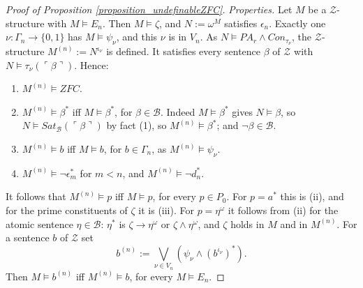 \documentclass{amsart}  %
\numberwithin{equation}{section}
\theoremstyle{definition}
\theoremstyle{remark}
\begin{document}
\begin{proof} [Proof of Proposition \ref{proposition_undefinableZFC}]
\emph{Properties.} Let $M$ be a $\mathcal{Z}$-structure with $M \models E _{n}$. Then $M \models \zeta$, and $N := \omega ^{M}$ satisfies $\epsilon _{n}$. Exactly one $\nu: \Gamma _{n} \to \{0,1\}$ has $M \models \psi _{\nu}$, and this $\nu$ is in $V _{n}$. As $N \models PA _{r} \land Con _{\tau _{\nu}}$, the $\mathcal{Z}$-structure $M ^{(n)} := N ^{\iota _{\nu}}$ is defined. It satisfies every sentence $\beta$ of $\mathcal{Z}$ with $N \models \tau _{\nu} (\ulcorner \beta \urcorner)$. Hence:
\begin{enumerate}
\item[(i)] $M ^{(n)} \models ZFC$.
\item[(ii)] $M ^{(n)} \models \beta ^{\ast}$ iff $M \models \beta ^{\ast}$, for $\beta \in \mathcal{B}$. Indeed $M \models \beta ^{\ast}$ gives $N \models \beta$, so $N \models Sat _{\mathcal{B}} (\ulcorner \beta \urcorner)$ by fact (1), so $M ^{(n)} \models \beta ^{\ast}$; and $\neg \beta \in \mathcal{B}$.
\item[(iii)] $M ^{(n)} \models b$ iff $M \models b$, for $b \in \Gamma _{n}$, as $M ^{(n)} \models \psi _{\nu}$.
\item[(iv)] $M ^{(n)} \models \neg \epsilon _{m} ^{\ast}$ for $m < n$, and $M ^{(n)} \models \neg d _{n} ^{\ast}$.
\end{enumerate}
It follows that $M ^{(n)} \models p$ iff $M \models p$, for every $p \in P _{0}$. For $p = a ^{\ast}$ this is (ii), and for the prime constituents of $\zeta$ it is (iii). For $p = \eta ^{\omega}$ it follows from (ii) for the atomic sentence $\eta \in \mathcal{B}$: $\eta ^{\ast}$ is $\zeta \to \eta ^{\omega}$ or $\zeta \land \eta ^{\omega}$, and $\zeta$ holds in $M$ and in $M ^{(n)}$. For a sentence $b$ of $\mathcal{Z}$ set
$$b ^{(n)} := \bigvee _{\nu \in V _{n}} \left( \psi _{\nu} \land (b ^{\iota _{\nu}}) ^{\ast} \right).$$
Then $M \models b ^{(n)}$ iff $M ^{(n)} \models b$, for every $M \models E _{n}$.


\end{proof}
\end{document}
